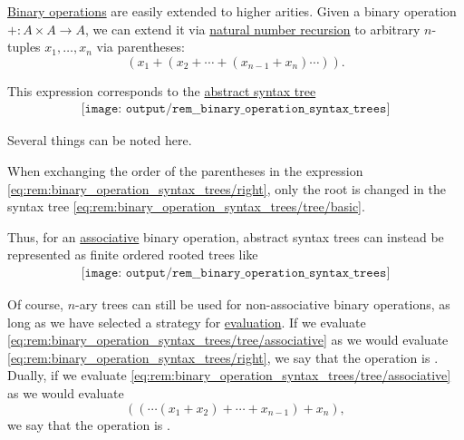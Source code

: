 \begin{remark}\label{rem:binary_operation_syntax_trees}
  \hyperref[def:binary_operation]{Binary operations} are easily extended to higher arities. Given a binary operation \( +: A \times A \to A \), we can extend it via \hyperref[rem:natural_number_recursion]{natural number recursion} to arbitrary \( n \)-tuples \( x_1, \ldots, x_n \) via parentheses:
  \begin{equation}\label{eq:rem:binary_operation_syntax_trees/right}
    (x_1 + (x_2 + \cdots + (x_{n-1} + x_n) \cdots )).
  \end{equation}

  This expression corresponds to the \hyperref[rem:abstract_syntax_tree]{abstract syntax tree}
  \begin{equation}\label{eq:rem:binary_operation_syntax_trees/tree/basic}
    \begin{aligned}
      \texttt{[image: output/rem\_\_binary\_operation\_syntax\_trees]}
    \end{aligned}
  \end{equation}

  Several things can be noted here.
  \begin{thmenum}
     When exchanging the order of the parentheses in the expression \eqref{eq:rem:binary_operation_syntax_trees/right}, only the root is changed in the syntax tree \eqref{eq:rem:binary_operation_syntax_trees/tree/basic}.

    Thus, for an \hyperref[def:binary_operation/associative]{associative} binary operation, abstract syntax trees can instead be represented as finite ordered rooted trees like
    \begin{equation}\label{eq:rem:binary_operation_syntax_trees/tree/associative}
      \begin{aligned}
        \texttt{[image: output/rem\_\_binary\_operation\_syntax\_trees]}
      \end{aligned}
    \end{equation}

    Of course, \( n \)-ary trees can still be used for non-associative binary operations, as long as we have selected a strategy for \hyperref[rem:evaluation]{evaluation}. If we evaluate \eqref{eq:rem:binary_operation_syntax_trees/tree/associative} as we would evaluate \eqref{eq:rem:binary_operation_syntax_trees/right}, we say that the operation is . Dually, if we evaluate \eqref{eq:rem:binary_operation_syntax_trees/tree/associative} as we would evaluate
    \begin{equation}\label{eq:rem:binary_operation_syntax_trees/left}
      (( \cdots (x_1 + x_2) + \cdots + x_{n-1}) + x_n),
    \end{equation}
    we say that the operation is .


\end{thmenum}
\end{remark}
